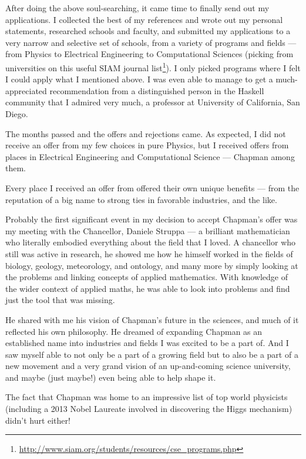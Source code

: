 \documentclass[]{article}
\renewcommand{\href}[2]{#2\footnote{\url{#1}}}
\begin{document}
After doing the above soul-searching, it came time to finally send out
my applications. I collected the best of my references and wrote out my
personal statements, researched schools and faculty, and submitted my
applications to a very narrow and selective set of schools, from a
variety of programs and fields --- from Physics to Electrical
Engineering to Computational Sciences (picking from universities on this
\href{http://www.siam.org/students/resources/cse_programs.php}{useful
SIAM journal list}). I only picked programs where I felt I could apply
what I mentioned above. I was even able to manage to get a
much-appreciated recommendation from a distinguished person in the
Haskell community that I admired very much, a professor at University of
California, San Diego.

The months passed and the offers and rejections came. As expected, I did
not receive an offer from my few choices in pure Physics, but I received
offers from places in Electrical Engineering and Computational Science
--- Chapman among them.

Every place I received an offer from offered their own unique benefits
--- from the reputation of a big name to strong ties in favorable
industries, and the like.

Probably the first significant event in my decision to accept Chapman's
offer was my meeting with the Chancellor, Daniele Struppa --- a
brilliant mathematician who literally embodied everything about the
field that I loved. A chancellor who still was active in research, he
showed me how he himself worked in the fields of biology, geology,
meteorology, and ontology, and many more by simply looking at the
problems and linking concepts of applied mathematics. With knowledge of
the wider context of applied maths, he was able to look into problems
and find just the tool that was missing.

He shared with me his vision of Chapman's future in the sciences, and
much of it reflected his own philosophy. He dreamed of expanding Chapman
as an established name into industries and fields I was excited to be a
part of. And I saw myself able to not only be a part of a growing field
but to also be a part of a new movement and a very grand vision of an
up-and-coming science university, and maybe (just maybe!) even being
able to help shape it.

The fact that Chapman was home to an impressive list of top world
physicists (including a 2013 Nobel Laureate involved in discovering the
Higgs mechanism) didn't hurt either!
\end{document}

